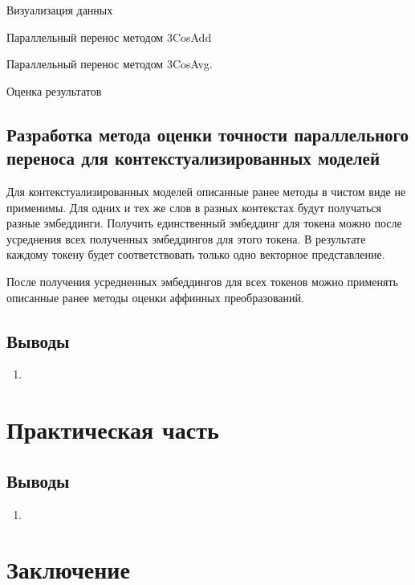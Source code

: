\documentclass[a4paper,14pt]{article}
\begin{document}
	Визуализация данных
	
	Параллельный перенос методом 3CosAdd
	
	Параллельный перенос методом 3CosAvg.
	
	Оценка результатов



\subsection{Разработка метода оценки точности параллельного переноса для контекстуализированных моделей}

Для контекстуализированных моделей описанные ранее методы в чистом виде не применимы.
Для одних и тех же слов в разных контекстах будут получаться разные эмбеддинги.
Получить единственный эмбеддинг для токена можно после усреднения всех полученных эмбеддингов для этого токена.
В результате каждому токену будет соответствовать только одно векторное представление.

После получения усредненных эмбеддингов для всех токенов можно применять описанные ранее методы оценки аффинных преобразований.


\subsection{Выводы}
\begin{enumerate}
	\itemsep0em 
	\item 
\end{enumerate}

\newpage
\section{Практическая часть}

\subsection{Выводы}
\begin{enumerate}
	\itemsep0em 
	\item 
\end{enumerate}

\newpage
\section{Заключение}

\newpage 
\renewcommand{\refname}{{\normalsize \hfill Список использованных источников \hfill}} 

\begin{thebibliography}{30}

\end{thebibliography}

\newpage
\end{document}
